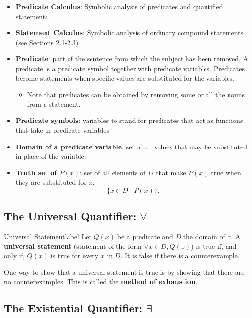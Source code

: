 \documentclass[a4paper]{report}
\begin{document}
\begin{itemize}
    \item \textbf{Predicate Calculus}: Symbolic analysis of predicates and quantified statements
    \item \textbf{Statement Calculus}: Symbolic analysis of ordinary compound statements (see Sections 2.1-2.3)
    \item \textbf{Predicate}: part of the sentence from which the subject has been removed. A predicate is a predicate symbol together with predicate variables. 
        Predicates become statements when specific values are substituted for the variables.
        \begin{itemize}
            \item Note that predicates can be obtained by removing some or all the nouns from a statement.
        \end{itemize}
    \item \textbf{Predicate symbols}: variables to stand for predicates that act as functions that take in predicate variables
    \item \textbf{Domain of a predicate variable}: set of all values that may be substituted in place of the variable.
    \item \textbf{Truth set of $P(x)$}: set of all elements of $D$ that make $P(x)$ true when they are substituted for $x$.
        \[
            \{x \in D  \mid P(x)\}
        .\] 
\end{itemize}

\subsection{The Universal Quantifier: $\forall $}

\begin{definition}{Universal Statement}{label}
    Let $Q(x)$ be a predicate and $D$ the domain of $x$. A \textbf{universal statement} (statement
    of the form $\forall x \in D, Q(x)$) is true if, and only if, $Q(x)$ is true for every $x$ in $D$. 
    It is false if there is a counterexample.
\end{definition}
One way to show that a universal statement is true is by showing that there are no counterexamples.
This is called the \textbf{method of exhaustion}.

\subsection{The Existential Quantifier: $\exists $}
\end{document}
